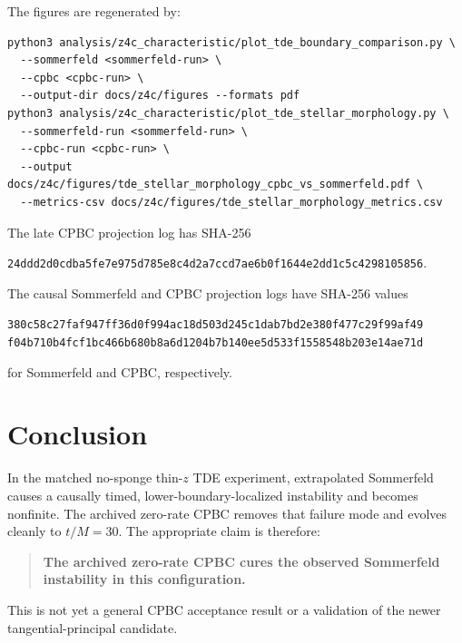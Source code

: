 \documentclass[11pt]{article}
\newcommand{\hash}[2]{\texttt{#1}\allowbreak\texttt{#2}}
\begin{document}
The figures are regenerated by:
\begin{verbatim}
python3 analysis/z4c_characteristic/plot_tde_boundary_comparison.py \
  --sommerfeld <sommerfeld-run> \
  --cpbc <cpbc-run> \
  --output-dir docs/z4c/figures --formats pdf
python3 analysis/z4c_characteristic/plot_tde_stellar_morphology.py \
  --sommerfeld-run <sommerfeld-run> \
  --cpbc-run <cpbc-run> \
  --output docs/z4c/figures/tde_stellar_morphology_cpbc_vs_sommerfeld.pdf \
  --metrics-csv docs/z4c/figures/tde_stellar_morphology_metrics.csv
\end{verbatim}
The late CPBC projection log has SHA-256
\begin{center}
\hash{24ddd2d0cdba5fe7e975d785e8c4d2a7}
{ccd7ae6b0f1644e2dd1c5c4298105856}.
\end{center}
The causal Sommerfeld and CPBC projection logs have SHA-256 values
\begin{center}
\hash{380c58c27faf947ff36d0f994ac18d503}
{d245c1dab7bd2e380f477c29f99af49}\\
\hash{f04b710b4fcf1bc466b680b8a6d1204}
{b7b140ee5d533f1558548b203e14ae71d}
\end{center}
for Sommerfeld and CPBC, respectively.

\section{Conclusion}

In the matched no-sponge thin-$z$ TDE experiment, extrapolated Sommerfeld
causes a causally timed, lower-boundary-localized instability and becomes
nonfinite.  The archived zero-rate CPBC removes that failure mode and
evolves cleanly to $t/M=30$.  The appropriate claim is therefore:
\begin{quote}
\textbf{The archived zero-rate CPBC cures the observed Sommerfeld
instability in this configuration.}
\end{quote}
This is not yet a general CPBC acceptance result or a validation of the newer
tangential-principal candidate.
\end{document}
